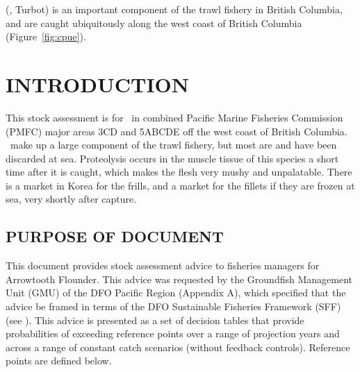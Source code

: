 

\fishname (\emph{\sciencename}, Turbot) is an important component of the trawl fishery in British Columbia, and are caught ubiquitously along the west coast of British Columbia (Figure~\ref{fig:cpue}).

\newpage	%



\clearpage

\setcounter{page}{1}

\section{INTRODUCTION}

This stock assessment is for \fishname\ in combined Pacific Marine Fisheries Commission (PMFC) major areas 3CD and 5ABCDE off the west coast of British Columbia. \fishname\ make up a large component of the trawl fishery, but most are and have been discarded at sea. Proteolysis occurs in the muscle tissue of this species a short time after it is caught, which makes the flesh very mushy and unpalatable. There is a market in Korea for the frills, and a market for the fillets if they are frozen at sea, very shortly after capture.

\subsection{PURPOSE OF DOCUMENT}

This document provides stock assessment advice to fisheries managers for Arrowtooth Flounder. This advice was requested by the Groundfish Management Unit (GMU) of the DFO Pacific Region (Appendix A), which specified that the advice be framed in terms of the DFO Sustainable Fisheries Framework (SFF) (see \citet{dfo09}). This advice is presented as a set of decision tables that provide probabilities of exceeding reference points over a range of projection years and across a range of constant catch scenarios (without feedback controls). Reference points are defined below.

